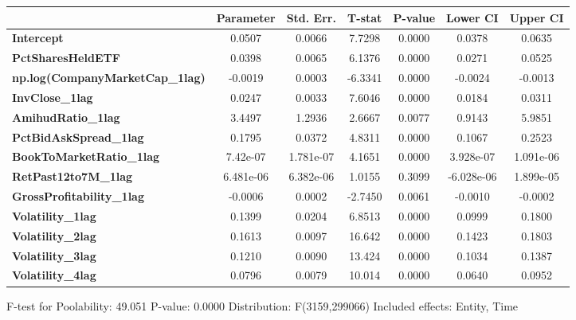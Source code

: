 \begin{center}
\begin{tabular}{lclc}
\bottomrule
\end{tabular}
\begin{tabular}{lcccccc}
                                        & \textbf{Parameter} & \textbf{Std. Err.} & \textbf{T-stat} & \textbf{P-value} & \textbf{Lower CI} & \textbf{Upper CI}  \\
\midrule
\textbf{Intercept}                      &       0.0507       &       0.0066       &      7.7298     &      0.0000      &       0.0378      &       0.0635       \\
\textbf{PctSharesHeldETF}               &       0.0398       &       0.0065       &      6.1376     &      0.0000      &       0.0271      &       0.0525       \\
\textbf{np.log(CompanyMarketCap\_1lag)} &      -0.0019       &       0.0003       &     -6.3341     &      0.0000      &      -0.0024      &      -0.0013       \\
\textbf{InvClose\_1lag}                 &       0.0247       &       0.0033       &      7.6046     &      0.0000      &       0.0184      &       0.0311       \\
\textbf{AmihudRatio\_1lag}              &       3.4497       &       1.2936       &      2.6667     &      0.0077      &       0.9143      &       5.9851       \\
\textbf{PctBidAskSpread\_1lag}          &       0.1795       &       0.0372       &      4.8311     &      0.0000      &       0.1067      &       0.2523       \\
\textbf{BookToMarketRatio\_1lag}        &      7.42e-07      &     1.781e-07      &      4.1651     &      0.0000      &     3.928e-07     &     1.091e-06      \\
\textbf{RetPast12to7M\_1lag}            &     6.481e-06      &     6.382e-06      &      1.0155     &      0.3099      &     -6.028e-06    &     1.899e-05      \\
\textbf{GrossProfitability\_1lag}       &      -0.0006       &       0.0002       &     -2.7450     &      0.0061      &      -0.0010      &      -0.0002       \\
\textbf{Volatility\_1lag}               &       0.1399       &       0.0204       &      6.8513     &      0.0000      &       0.0999      &       0.1800       \\
\textbf{Volatility\_2lag}               &       0.1613       &       0.0097       &      16.642     &      0.0000      &       0.1423      &       0.1803       \\
\textbf{Volatility\_3lag}               &       0.1210       &       0.0090       &      13.424     &      0.0000      &       0.1034      &       0.1387       \\
\textbf{Volatility\_4lag}               &       0.0796       &       0.0079       &      10.014     &      0.0000      &       0.0640      &       0.0952       \\
\bottomrule
\end{tabular}
\end{center}

F-test for Poolability: 49.051 \newline
 P-value: 0.0000 \newline
 Distribution: F(3159,299066) \newline
  \newline
 Included effects: Entity, Time